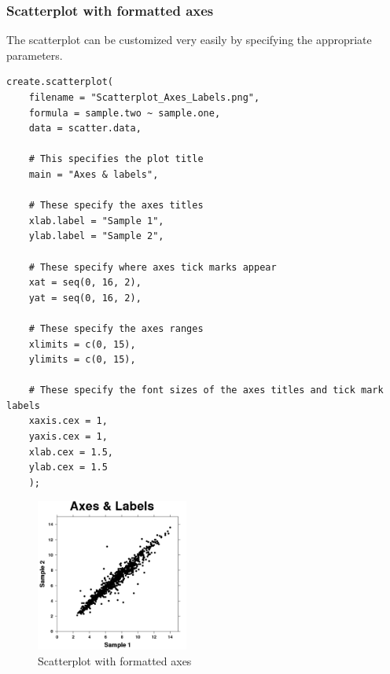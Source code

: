 \documentclass[letterpaper]{article}
\begin{document}
\subsubsection{Scatterplot with formatted axes}
The scatterplot can be customized very easily by specifying the appropriate parameters. 
\begin{verbatim}
create.scatterplot(
    filename = "Scatterplot_Axes_Labels.png",
    formula = sample.two ~ sample.one,
    data = scatter.data,

    # This specifies the plot title
    main = "Axes & labels",
    
    # These specify the axes titles
    xlab.label = "Sample 1",
    ylab.label = "Sample 2",

    # These specify where axes tick marks appear
    xat = seq(0, 16, 2),
    yat = seq(0, 16, 2),
    
    # These specify the axes ranges
    xlimits = c(0, 15),
    ylimits = c(0, 15),
    
    # These specify the font sizes of the axes titles and tick mark labels
    xaxis.cex = 1,
    yaxis.cex = 1,
    xlab.cex = 1.5,
    ylab.cex = 1.5
    );
\end{verbatim}
\begin{figure}[!ht]
  \begin{center}
     \includegraphics[width=50mm]{Figures/Scatterplot_Axes_Labels.png}
     \caption{Scatterplot with formatted axes}
  \end{center}
\end{figure}
\end{document}
